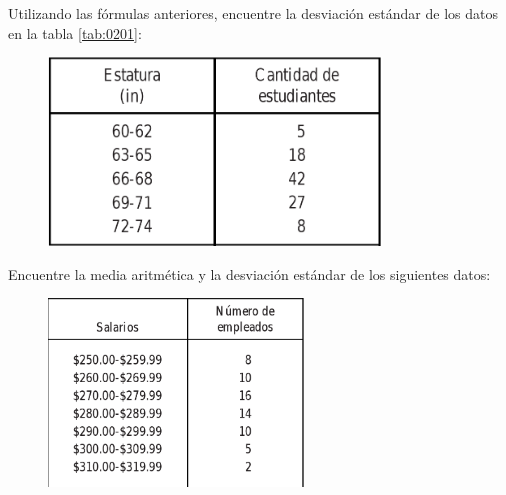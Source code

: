 \begin{problema}
	\label{problema:4.17}
	Utilizando las fórmulas anteriores, encuentre la desviación estándar de los datos en la tabla \ref{tab:0201}:
	\begin{figure}[ht]
		\centering
		\includegraphics[height=5cm,keepaspectratio=true]{./images/tab0201.png}
	\end{figure}
	
\end{problema}




\begin{problema}
	\label{problema:4.18}
	Encuentre la media aritmética y  la desviación estándar de los siguientes datos:
	\begin{figure}[ht]
		\centering
		\includegraphics[height=5cm]{./images/tab0205.png}
		\label{tab:0205}
	\end{figure}
	
\end{problema}

